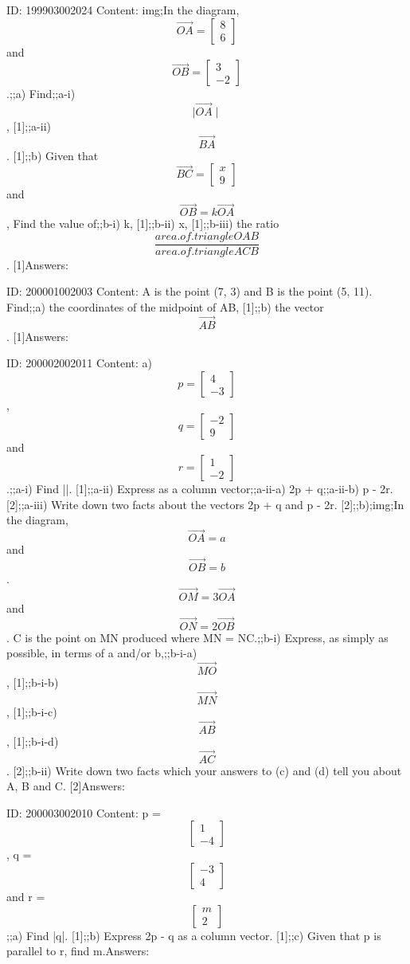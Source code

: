 \documentclass{article}
\begin{document}
ID: 199903002024
Content:
img;In the diagram, $$\vec{OA} = \begin{bmatrix}8\\6\end{bmatrix}$$ and $$\vec{OB} = \begin{bmatrix}3\\-2\end{bmatrix}$$.;;a) Find;;a-i) $$\mid\vec{OA}\mid$$, [1];;a-ii) $$\vec{BA}$$. [1];;b) Given that $$\vec{BC} = \begin{bmatrix}x\\9\end{bmatrix}$$ and $$\vec{OB} = k \vec{OA}$$, Find the value of;;b-i) k, [1];;b-ii) x, [1];;b-iii) the ratio $$\frac{area.of.triangle OAB}{area.of.triangle ACB}$$. [1]Answers:

ID: 200001002003
Content:
A is the point (7, 3) and B is the point (5, 11). Find;;a) the coordinates of the midpoint of AB, [1];;b) the vector $$\vec{AB}$$. [1]Answers:

ID: 200002002011
Content:
a) $$p=\begin{bmatrix}4\\-3\end{bmatrix}$$, $$q=\begin{bmatrix}-2\\9\end{bmatrix}$$ and $$r=\begin{bmatrix}1\\-2\end{bmatrix}$$.;;a-i) Find |\q|. [1];;a-ii) Express as a column vector;;a-ii-a) 2p + q;;a-ii-b) p - 2r. [2];;a-iii) Write down two facts about the vectors 2p + q and p - 2r. [2];;b);img;In the diagram, $$\vec{OA}=a$$ and $$\vec{OB}=b$$.$$\vec{OM}=3\vec{OA}$$ and $$\vec{ON}=2\vec{OB}$$. C is the point on MN produced where MN = NC.;;b-i) Express, as simply as possible, in terms of a and/or b,;;b-i-a) $$\vec{MO}$$, [1];;b-i-b) $$\vec{MN}$$, [1];;b-i-c) $$\vec{AB}$$, [1];;b-i-d) $$\vec{AC}$$. [2];;b-ii) Write down two facts which your answers to (c) and (d) tell you about A, B and C. [2]Answers:

ID: 200003002010
Content:
p = $$\begin{bmatrix}1\\-4\end{bmatrix}$$, q = $$\begin{bmatrix}-3\\4\end{bmatrix}$$ and r = $$\begin{bmatrix}m\\2\end{bmatrix}$$;;a) Find |q|. [1];;b) Express 2p - q as a column vector. [1];;c) Given that p is parallel to r, find m.Answers:
\end{document}
